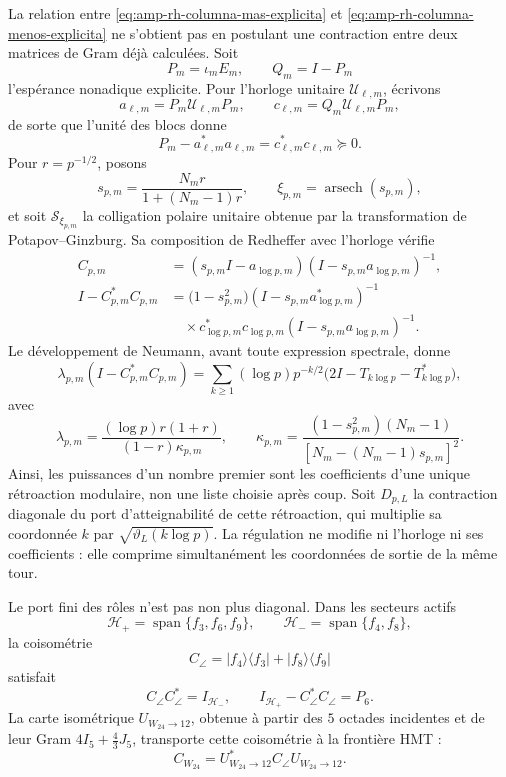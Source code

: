 La relation entre \eqref{eq:amp-rh-columna-mas-explicita} et \eqref{eq:amp-rh-columna-menos-explicita} ne s'obtient pas en postulant une contraction entre deux matrices de Gram déjà calculées. Soit
\[
 P_m=\iota_mE_m,\qquad Q_m=I-P_m
\]
l'espérance nonadique explicite. Pour l'horloge unitaire \(\mathscr U_{\ell,m}\), écrivons
\[
 a_{\ell,m}=P_m\mathscr U_{\ell,m}P_m,\qquad
 c_{\ell,m}=Q_m\mathscr U_{\ell,m}P_m ,
\]
de sorte que l'unité des blocs donne
\begin{equation}\label{eq:amp-rh-defecto-schwarz-reloj}
 P_m-a_{\ell,m}^*a_{\ell,m}
 =c_{\ell,m}^*c_{\ell,m}\succeq0.
\end{equation}
Pour \(r=p^{-1/2}\), posons
\[
 s_{p,m}=\frac{N_mr}{1+(N_m-1)r},
 \qquad \xi_{p,m}=\operatorname{arsech}(s_{p,m}),
\]
et soit \(\mathscr S_{\xi_{p,m}}\) la colligation polaire unitaire obtenue par la transformation de Potapov--Ginzburg. Sa composition de Redheffer avec l'horloge vérifie
\begin{align}
 C_{p,m}&=(s_{p,m}I-a_{\log p,m})
          (I-s_{p,m}a_{\log p,m})^{-1},\nonumber\\
 I-C_{p,m}^*C_{p,m}
 &=\bigl(1-s_{p,m}^2\bigr)
   (I-s_{p,m}a_{\log p,m}^*)^{-1}\nonumber\\
 &\quad{}\times c_{\log p,m}^*c_{\log p,m}
   (I-s_{p,m}a_{\log p,m})^{-1}.
   \label{eq:amp-rh-redheffer-defecto}
\end{align}
Le développement de Neumann, avant toute expression spectrale, donne
\begin{equation}\label{eq:amp-rh-torre-prima-explicita}
 \lambda_{p,m}(I-C_{p,m}^*C_{p,m})
 =\sum_{k\geq1}(\log p)p^{-k/2}
  \bigl(2I-T_{k\log p}-T_{k\log p}^*\bigr),
\end{equation}
avec
\[
 \lambda_{p,m}
 =\frac{(\log p)r(1+r)}
 {(1-r)\kappa_{p,m}},
 \qquad
 \kappa_{p,m}
 =\frac{(1-s_{p,m}^2)(N_m-1)}
 {[N_m-(N_m-1)s_{p,m}]^2}.
\]
Ainsi, les puissances d'un nombre premier sont les coefficients d'une unique rétroaction modulaire, non une liste choisie après coup. Soit \(D_{p,L}\) la contraction diagonale du port d'atteignabilité de cette rétroaction, qui multiplie sa coordonnée \(k\) par \(\sqrt{\vartheta_L(k\log p)}\). La régulation ne modifie ni l'horloge ni ses coefficients : elle comprime simultanément les coordonnées de sortie de la même tour.

Le port fini des rôles n'est pas non plus diagonal. Dans les secteurs actifs
\[
 \mathcal H_+
 =\operatorname{span}\{f_3,f_6,f_9\},\qquad
 \mathcal H_-=\operatorname{span}\{f_4,f_8\},
\]
la coisométrie
\begin{equation}\label{eq:amp-rh-acoplamiento-angular}
 C_\angle
 =|f_4\rangle\langle f_3|
  +|f_8\rangle\langle f_9|
\end{equation}
satisfait
\[
 C_\angle C_\angle^*=I_{\mathcal H_-},\qquad
 I_{\mathcal H_+}-C_\angle^*C_\angle=P_6.
\]
La carte isométrique \(U_{W_{24}\to12}\), obtenue à partir des \(5\) octades incidentes et de leur Gram \(4I_5+\frac43J_5\), transporte cette coisométrie à la frontière HMT :
\[
 C_{W_{24}}
 =U_{W_{24}\to12}^*C_\angle U_{W_{24}\to12}.
\]

